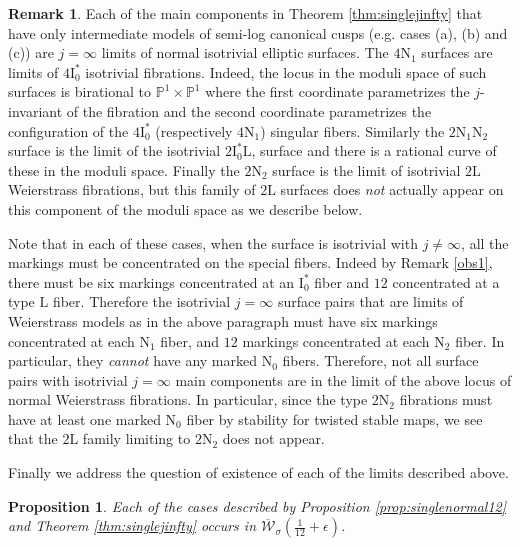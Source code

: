 \documentclass[11pt]{amsart}
\newtheorem{prop}[theorem]{Proposition}
\theoremstyle{definition}
\newtheorem{remark}[theorem]{Remark}
\theoremstyle{remark}
\newcommand{\calW}{\mathcal W}
\newcommand{\ktwelve}{\overline{\calW}_\sigma({\frac{1}{12}+\epsilon})}
\begin{document}
	\begin{remark} Each of the main components in Theorem \ref{thm:singlejinfty} that have only intermediate models of semi-log canonical cusps (e.g. cases (a), (b) and (c)) are $j = \infty$ limits of normal isotrivial elliptic surfaces. The $4\mathrm{N}_1$ surfaces are limits of $4\mathrm{I}_0^*$ isotrivial fibrations. Indeed, the locus in the moduli space of such surfaces is birational to $\mathbb{P}^1 \times \mathbb{P}^1$ where the first coordinate parametrizes the $j$-invariant of the fibration and the second coordinate parametrizes the configuration of the $4\mathrm{I}_0^*$ (respectively $4\mathrm{N}_1$) singular fibers. Similarly the $2\mathrm{N}_1 \mathrm{N}_2$ surface is the limit of the isotrivial $2\mathrm{I}_0^* \mathrm{L}$, surface and there is a rational curve of these in the moduli space. Finally the $2\mathrm{N}_2$ surface is the limit of isotrivial $2\mathrm{L}$ Weierstrass fibrations, but this family of $2\mathrm{L}$ surfaces does \emph{not} actually appear on this component of the moduli space as we describe below. 
		
		Note that in each of these cases, when the surface is isotrivial with $j \neq \infty$, all the markings must be concentrated on the special fibers. Indeed by Remark \ref{obs1}, there must be six markings concentrated at an $\mathrm{I}_0^*$ fiber and $12$ concentrated at a type $\mathrm{L}$ fiber. Therefore the isotrivial $j = \infty$ surface pairs that are limits of Weierstrass models as in the above paragraph must have six markings concentrated at each $\mathrm{N}_1$ fiber, and $12$ markings concentrated at each $\mathrm{N}_2$ fiber. In particular, they \emph{cannot} have any marked $\mathrm{N}_0$ fibers. Therefore, not all surface pairs with isotrivial $j = \infty$ main components are in the limit of the above locus of normal Weierstrass fibrations. In particular, since the type $2\mathrm{N}_2$ fibrations must have at least one marked $\mathrm{N}_0$ fiber by stability for twisted stable maps, we see that the $2\mathrm{L}$ family limiting to $2\mathrm{N}_2$ does not appear. 
	\end{remark}
	
	Finally we address the question of existence of each of the limits described above. 
	
	\begin{prop}\label{prop:exist1} Each of the cases described by Proposition \ref{prop:singlenormal12} and Theorem \ref{thm:singlejinfty} occurs in $\ktwelve$. 
	\end{prop}
	
\end{document}
